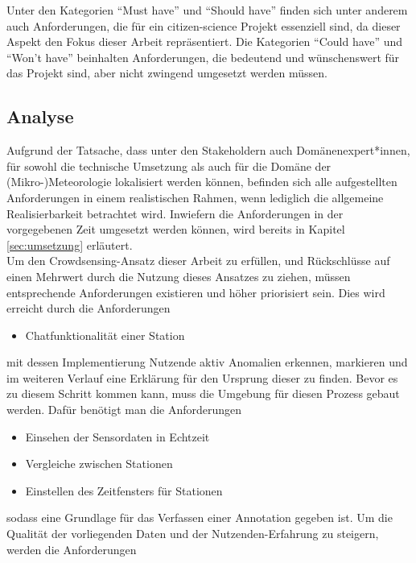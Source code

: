 Unter den Kategorien \enquote{Must have} und \enquote{Should have} finden sich unter anderem auch Anforderungen, die für ein citizen-science Projekt essenziell sind, da dieser Aspekt den Fokus dieser Arbeit repräsentiert. Die Kategorien \enquote{Could have} und \enquote{Won't have} beinhalten Anforderungen, die bedeutend und wünschenswert für das Projekt sind, aber nicht zwingend umgesetzt werden müssen. 

\subsection{Analyse}
Aufgrund der Tatsache, dass unter den Stakeholdern auch Domänenexpert*innen, für sowohl die technische Umsetzung als auch für die Domäne der (Mikro-)Meteorologie lokalisiert werden können, befinden sich alle aufgestellten Anforderungen in einem realistischen Rahmen, wenn lediglich die allgemeine Realisierbarkeit betrachtet wird. Inwiefern die Anforderungen in der vorgegebenen Zeit umgesetzt werden können, wird bereits in Kapitel \ref{sec:umsetzung} erläutert. \\ Um den Crowdsensing-Ansatz dieser Arbeit zu erfüllen, und Rückschlüsse auf einen Mehrwert durch die Nutzung dieses Ansatzes zu ziehen, müssen entsprechende Anforderungen existieren und höher priorisiert sein. Dies wird erreicht durch die Anforderungen 

\begin{itemize}
    \item Chatfunktionalität einer Station
\end{itemize}

mit dessen Implementierung Nutzende aktiv Anomalien erkennen, markieren und im weiteren Verlauf eine Erklärung für den Ursprung dieser zu finden. Bevor es zu diesem Schritt kommen kann, muss die Umgebung für diesen Prozess gebaut werden. Dafür benötigt man die Anforderungen 

\begin{itemize}
    \item Einsehen der Sensordaten in Echtzeit
    \item Vergleiche zwischen Stationen
    \item Einstellen des Zeitfensters für Stationen
\end{itemize}

sodass eine Grundlage für das Verfassen einer Annotation gegeben ist. Um die Qualität der vorliegenden Daten und der Nutzenden-Erfahrung zu steigern, werden die Anforderungen 

